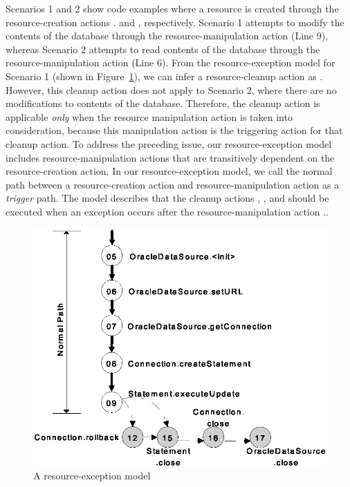 Scenarios 1 and 2 show code examples where a  resource is created through 
the resource-creation actions .
and , respectively. Scenario 1
attempts to modify the contents of the database through the resource-manipulation
action  (Line 9), whereas Scenario 2 attempts to read contents
of the database through the resource-manipulation action  (Line 6).
From the resource-exception model for Scenario 1 (shown in Figure~\ref{fig:resourcemanip}), we can infer
a resource-cleanup action as . However,
this cleanup action does not apply to Scenario 2, where there are no modifications
to contents of the database. Therefore, the cleanup action 
is applicable \emph{only} when the resource manipulation action 
is taken into consideration, because this manipulation action is the triggering
action for that cleanup action. To address the preceding issue, our resource-exception 
model includes resource-manipulation actions 
that are transitively dependent on the resource-creation action.
In our resource-exception model, we call the normal path between 
a resource-creation action and resource-manipulation
action as a \emph{trigger} path. The model describes that the cleanup
actions , , and 
should be executed when an exception
occurs after the resource-manipulation action ..

\begin{figure}[t]
\centering
\includegraphics[scale=0.60,clip]{figs/approach-resexpmodel1.eps}\vspace*{-3ex}
\caption{\label{fig:resourcemanip} A resource-exception model} \vspace*{-4ex}
\end{figure}

